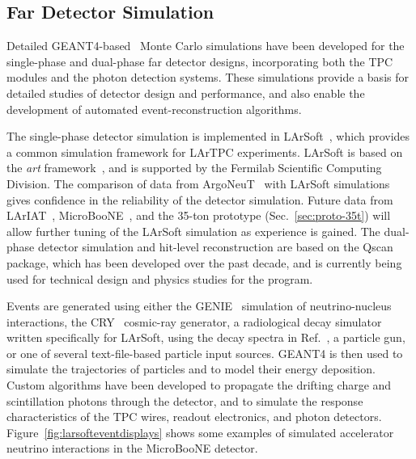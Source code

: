 \subsection{Far Detector Simulation}
\label{sec:detectors-sc-physics-software-simulation-fd}

Detailed GEANT4-based~\cite{GEANT4:NIM,GEANT4} Monte Carlo simulations
have been developed for the single-phase and dual-phase far detector
designs, incorporating both the TPC modules and the photon detection
systems. These simulations provide a basis for detailed studies of
detector design and performance, and also enable the development of
automated event-reconstruction algorithms.

The single-phase detector simulation is implemented in
LArSoft~\cite{Church:2013hea}, which provides a common simulation
framework for LArTPC experiments.  LArSoft is based on the {\it art}
framework~\cite{Green:2012gv}, and is supported by the Fermilab
Scientific Computing Division.  The comparison of data from
ArgoNeuT~\cite{Anderson:2012vc,Anderson:2012mra} with LArSoft
simulations gives confidence in the reliability of the detector
simulation.  Future data from
LArIAT~\cite{Adamson:2013/02/28tla,Cavanna:2014iqa},
MicroBooNE~\cite{Chen:2007ae,Jones:2011ci,microboonecdr}, and the
35-ton prototype (Sec.~\ref{sec:proto-35t}) will allow further tuning
of the LArSoft simulation as experience is gained.  The dual-phase
detector simulation and hit-level reconstruction are based on the
Qscan~\cite{lussi:thesis} package, which has been developed over the
past decade, and is currently being used for technical design and
physics studies for the \cerndualproto{} program.

Events are generated using either the GENIE~\cite{GENIE} simulation of 
neutrino-nucleus interactions, the CRY~\cite{Cosmic-CRY,Cosmic-CRY-protons,CRY-url} cosmic-ray generator, 
a radiological decay simulator written specifically for LArSoft, using the decay spectra
in Ref.~\cite{docdb-8797}, a particle gun, or one of several
text-file-based particle input sources. GEANT4 is then used to simulate the trajectories
of particles and to model their energy deposition.  
Custom algorithms have been developed to propagate the drifting charge
and scintillation photons through the detector, and to simulate the
response characteristics of the TPC wires, readout electronics, and photon detectors.
Figure~\ref{fig:larsofteventdisplays} shows some examples of simulated 
accelerator neutrino interactions in the MicroBooNE detector.

